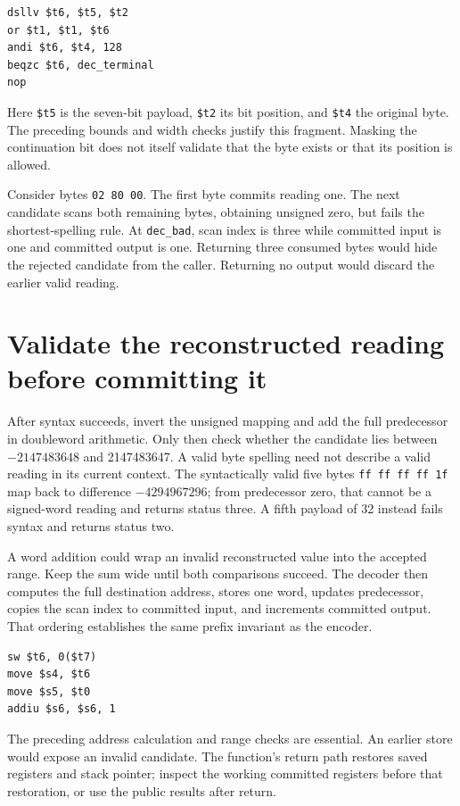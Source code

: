 \begin{verbatim}
dsllv $t6, $t5, $t2
or $t1, $t1, $t6
andi $t6, $t4, 128
beqzc $t6, dec_terminal
nop
\end{verbatim}
Here \texttt{\$t5} is the seven-bit payload, \texttt{\$t2} its bit position,
and \texttt{\$t4} the original byte. The preceding bounds and width checks
justify this fragment. Masking the continuation bit does not itself validate
that the byte exists or that its position is allowed.

Consider bytes \texttt{02 80 00}. The first byte commits reading one. The next
candidate scans both remaining bytes, obtaining unsigned zero, but fails the
shortest-spelling rule. At \texttt{dec\_bad}, scan index is three while committed
input is one and committed output is one. Returning three consumed bytes would
hide the rejected candidate from the caller. Returning no output would discard
the earlier valid reading.

\section{Validate the reconstructed reading before committing it}

After syntax succeeds, invert the unsigned mapping and add the full predecessor
in doubleword arithmetic. Only then check whether the candidate lies between
$-2147483648$ and 2147483647. A valid byte spelling need not describe a valid
reading in its current context. The syntactically valid five bytes
\texttt{ff ff ff ff 1f} map back to difference $-4294967296$; from predecessor
zero, that cannot be a signed-word reading and returns status three. A fifth
payload of 32 instead fails syntax and returns status two.

A word addition could wrap an invalid reconstructed value into the accepted
range. Keep the sum wide until both comparisons succeed. The decoder then
computes the full destination address, stores one word, updates predecessor,
copies the scan index to committed input, and increments committed output.
That ordering establishes the same prefix invariant as the encoder.

\begin{verbatim}
sw $t6, 0($t7)
move $s4, $t6
move $s5, $t0
addiu $s6, $s6, 1
\end{verbatim}
The preceding address calculation and range checks are essential. An earlier
store would expose an invalid candidate. The function's return path restores
saved registers and stack pointer; inspect the working committed registers before
that restoration, or use the public results after return.

